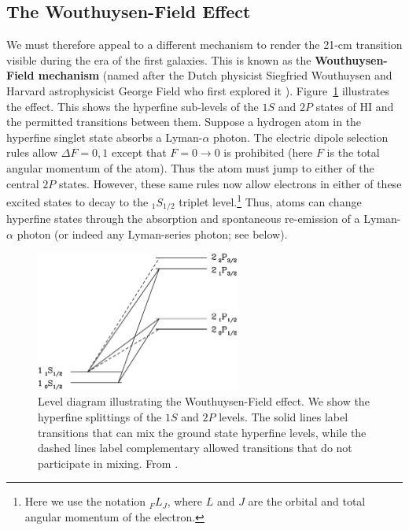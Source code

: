 \subsection{The Wouthuysen-Field Effect} \label{wf}

We must therefore appeal to a different mechanism to render the 21-cm transition visible during the era of the first galaxies.  This is known as the {\bf Wouthuysen-Field mechanism} (named after the Dutch physicist Siegfried
Wouthuysen and Harvard astrophysicist George Field who first explored it \cite{wouthuysen52, field58}). Figure~\ref{fig:wf} illustrates the effect. This shows the hyperfine sub-levels of the $1S$ and $2P$ states of HI and the permitted transitions between them.  Suppose a hydrogen atom in the hyperfine singlet state absorbs a Lyman-$\alpha$ photon.  The electric dipole selection rules allow $\Delta F=0,1$ except that $F=0 \rightarrow 0$ is prohibited (here $F$ is the total angular momentum of the atom).  Thus the atom must jump to either of the central $2P$ states.  However, these same rules now allow electrons in either of these excited states to decay to the $_1S_{1/2}$ triplet level.\footnote{Here we use the notation $_F L_J$, where $L$ and $J$ are the orbital and total angular momentum of the electron.}  Thus, atoms can change hyperfine states through the absorption and spontaneous re-emission of a Lyman-$\alpha$ photon (or indeed any Lyman-series photon; see below).

\begin{figure}[]
\begin{center}
\includegraphics[width=0.6\textwidth]{Furlanetto/figure2-2}
\end{center}
\caption{Level diagram illustrating the Wouthuysen-Field effect.  We show the hyperfine splittings of the $1S$ and $2P$ levels.  The solid lines label transitions that can mix the ground state hyperfine levels, while the dashed lines label complementary allowed transitions that do not participate in mixing.  From \cite{pritchard06}.}
\label{fig:wf}
\end{figure}

